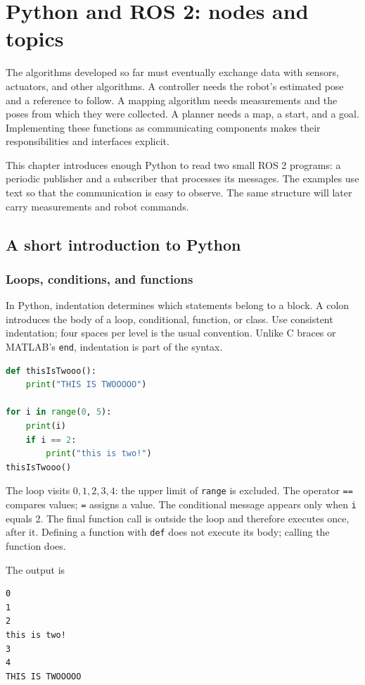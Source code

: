 \chapter{Python and ROS 2: nodes and topics}
\label{ch:ros2}
The algorithms developed so far must eventually exchange data with sensors,
actuators, and other algorithms. A controller needs the robot's estimated
pose and a reference to follow. A mapping algorithm needs measurements and
the poses from which they were collected. A planner needs a map, a start,
and a goal. Implementing these functions as communicating components makes
their responsibilities and interfaces explicit.

This chapter introduces enough Python to read two small ROS 2 programs:
a periodic publisher and a subscriber that processes its messages. The
examples use text so that the communication is easy to observe. The same
structure will later carry measurements and robot commands.

\section{A short introduction to Python}
\subsection{Loops, conditions, and functions}
In Python, indentation determines which statements belong to a block.
A colon introduces the body of a loop, conditional, function, or class.
Use consistent indentation; four spaces per level is the usual convention.
Unlike C braces or MATLAB's \texttt{end}, indentation is part of the syntax.

\begin{lstlisting}[style=robotcode,language=Python]
def thisIsTwooo():
    print("THIS IS TWOOOOO")

for i in range(0, 5):
    print(i)
    if i == 2:
        print("this is two!")
thisIsTwooo()
\end{lstlisting}
The loop visits $0,1,2,3,4$: the upper limit of \texttt{range} is excluded.
The operator \texttt{==} compares values; \texttt{=} assigns a value.
The conditional message appears only when \texttt{i} equals 2. The final
function call is outside the loop and therefore executes once, after it.
Defining a function with \texttt{def} does not execute its body; calling
the function does.

\begin{minipage}{\linewidth}
The output is
\begin{lstlisting}[style=robotcode]
0
1
2
this is two!
3
4
THIS IS TWOOOOO
\end{lstlisting}
\end{minipage}

